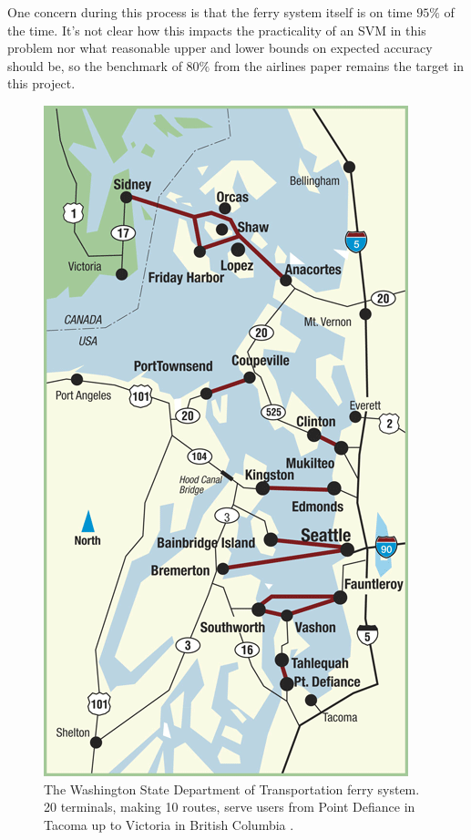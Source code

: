 \documentclass[11pt]{article} %
\begin{document}
One concern during this process is that the ferry 
system itself is on time $95\%$ of the time. It's not clear how this impacts the
practicality of an SVM in this problem nor what reasonable upper and lower bounds
on expected accuracy should be, so the benchmark of $80\%$ from the
airlines paper \cite{smith2008decision} remains the target in this project.

\begin{figure}
  \centering
  \includegraphics[scale=.4]{images/route-map-overview.png}
  \caption{The Washington State Department of Transportation ferry system. 20
  terminals, making 10 routes, serve users from Point Defiance in Tacoma up to
  Victoria in British Columbia \cite{wsdotVesselWatch}.}
  \label{fig:ferry_system}
\end{figure}
\end{document}
